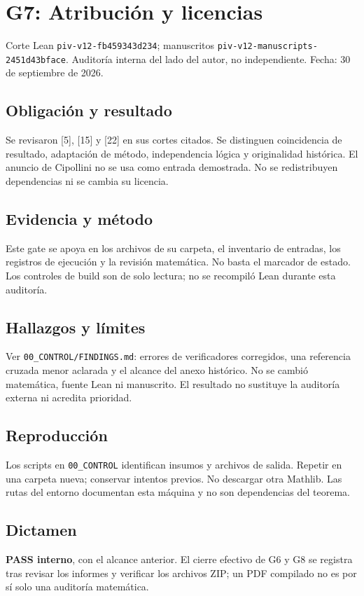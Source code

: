 \documentclass[11pt]{article}
\begin{document}
\section{G7: Atribución y licencias}\label{g7-atribuciuxf3n-y-licencias}

Corte Lean \nolinkurl{piv-v12-fb459343d234}; manuscritos
\nolinkurl{piv-v12-manuscripts-2451d43bface}. Auditoría interna del lado
del autor, no independiente. Fecha: 30 de septiembre de 2026.

\subsection{Obligación y resultado}\label{obligaciuxf3n-y-resultado}

Se revisaron {[}5{]}, {[}15{]} y {[}22{]} en sus cortes citados. Se
distinguen coincidencia de resultado, adaptación de método,
independencia lógica y originalidad histórica. El anuncio de Cipollini
no se usa como entrada demostrada. No se redistribuyen dependencias ni
se cambia su licencia.

\subsection{Evidencia y método}\label{evidencia-y-muxe9todo}

Este gate se apoya en los archivos de su carpeta, el inventario de
entradas, los registros de ejecución y la revisión matemática. No basta
el marcador de estado. Los controles de build son de solo lectura; no se
recompiló Lean durante esta auditoría.

\subsection{Hallazgos y límites}\label{hallazgos-y-luxedmites}

Ver \nolinkurl{00_CONTROL/FINDINGS.md}: errores de verificadores
corregidos, una referencia cruzada menor aclarada y el alcance del anexo
histórico. No se cambió matemática, fuente Lean ni manuscrito. El
resultado no sustituye la auditoría externa ni acredita prioridad.

\subsection{Reproducción}\label{reproducciuxf3n}

Los scripts en \nolinkurl{00_CONTROL} identifican insumos y archivos de
salida. Repetir en una carpeta nueva; conservar intentos previos. No
descargar otra Mathlib. Las rutas del entorno documentan esta máquina y
no son dependencias del teorema.

\subsection{Dictamen}\label{dictamen}

\textbf{PASS interno}, con el alcance anterior. El cierre efectivo de G6
y G8 se registra tras revisar los informes y verificar los archivos ZIP;
un PDF compilado no es por sí solo una auditoría matemática.
\end{document}
